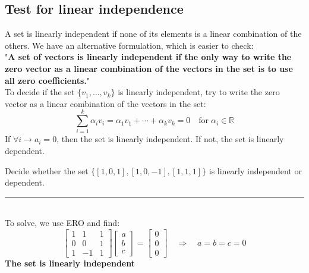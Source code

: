 \documentclass[a4paper, 9pt]{extarticle}
\begin{document}
\subsection{Test for linear independence}
A set is linearly independent if none of its elements is a linear combination of the others. We have an alternative formulation, which is easier to check: \\
"\textbf{A set of vectors is linearly independent if the only way to write the zero vector as a linear combination of the vectors in the set is to use all zero coefficients.}" \\
To decide if the set $\{v_1, \dots, v_k\}$ is linearly independent, try to write the zero vector as a linear combination of the vectors in the set:
$$
  \sum_{i=1}^k \alpha_i v_i = \alpha_1 v_1 + \cdots + \alpha_k v_k = 0 \quad \text{for} \; \alpha_i \in \mathbb{R}
$$
If $\forall i \rightarrow a_i = 0$, then the set is linearly independent. If not, the set is linearly dependent.
\begin{examplebox}{}{}
  Decide whether the set $\{[1,0,1], [1,0,-1], [1,1,1]\}$ is linearly independent or dependent. \\
  \rule{\textwidth}{1px} \\
  To solve, we use ERO and find:
  $$
    \begin{bmatrix}
      1 & 1  & 1 \\
      0 & 0  & 1 \\
      1 & -1 & 1
    \end{bmatrix}
    \begin{bmatrix}
      a \\
      b \\
      c
    \end{bmatrix}
    =
    \begin{bmatrix}
      0 \\
      0 \\
      0
    \end{bmatrix}
    \quad \Rightarrow \quad
    a = b = c = 0
  $$
  \textbf{The set is linearly independent}
\end{examplebox}
\end{document}
